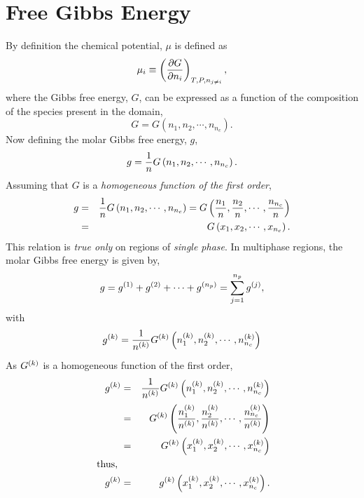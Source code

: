 \section{Free Gibbs Energy}\label{Chapter:ThermodynamicFormulation:Section:GibbsEnergy}
By definition the chemical potential, $\mu$ is defined as
\begin{equation}
   \mu_{i} \equiv \Partial[G]{n_{i}}{T,P,n_{j\ne i}},
\end{equation}
where the Gibbs free energy, $G$, can be expressed as a function of the composition of the species present in the domain,
\begin{equation}
   G = G\left(n_{1}, n_{2}, \cdots, n_{n_{c}}\right).
\end{equation}
Now defining the molar Gibbs free energy, $g$,
\begin{displaymath}
   g = \frc{1}{n}G\left(n_{1}, n_{2}, \cdots, n_{n_{c}}\right).
\end{displaymath}
Assuming that $G$ is a {\it homogeneous function of the first order},
\begin{eqnarray}
   g &=& \frc{1}{n}G\left(n_{1}, n_{2}, \cdots, n_{n_{c}}\right) = G\left(\frc{n_{1}}{n}, \frc{n_{2}}{n}, \cdots, \frc{n_{n_{c}}}{n}\right) \nonumber \\
     &=& G\left(x_{1}, x_{2}, \cdots, x_{n_{c}}\right). \nonumber
\end{eqnarray}
This relation is {\it true only} on regions of {\it single phase}. In multiphase regions, the molar Gibbs free energy is given by,
\begin{equation}
   g = \mfr[g]{}{1} + \mfr[g]{}{2} + \cdots + \mfr[g]{}{n_{p}} = \summation_{j=1}^{n_{p}}\mfr[g]{}{j},
\end{equation}
with
\begin{displaymath}
   \mfr[g]{}{k} = \frc{1}{\mfr[n]{}{k}} \mfr[G]{}{k}\left(\mfr[n]{1}{k}, \mfr[n]{2}{k}, \cdots, \mfr[n]{n_{c}}{k}\right)
\end{displaymath}
As $\mfr[G]{}{k}$ is a homogeneous function of the first order,
\begin{eqnarray}
 \mfr[g]{}{k} &=& \frc{1}{\mfr[n]{}{k}} \mfr[G]{}{k}\left(\mfr[n]{1}{k}, \mfr[n]{2}{k}, \cdots, \mfr[n]{n_{c}}{k}\right) \nonumber \\
              &=&  \mfr[G]{}{k}\left( \frc{\mfr[n]{1}{k}}{\mfr[n]{}{k}}, \frc{\mfr[n]{2}{k}}{\mfr[n]{}{k}}, \cdots, \frc{\mfr[n]{n_{c}}{k}}{\mfr[n]{}{k}}\right) \nonumber \\
              &=&  \mfr[G]{}{k}\left(\mfr[x]{1}{k}, \mfr[x]{2}{k}, \cdots, \mfr[x]{n_{c}}{k}\right) \nonumber \\
    \text{ thus, }     && \nonumber\\
\mfr[g]{}{k} &=&  \mfr[g]{}{k}\left(\mfr[x]{1}{k}, \mfr[x]{2}{k}, \cdots, \mfr[x]{n_{c}}{k}\right). 
\end{eqnarray}

